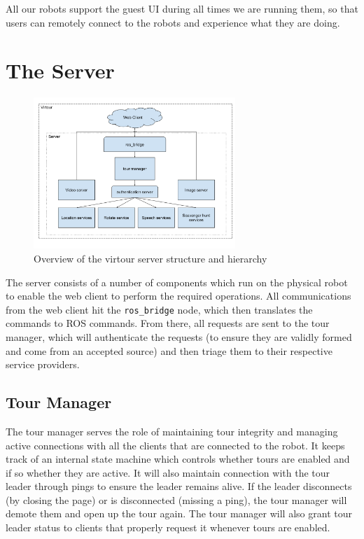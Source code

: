 \documentclass[
  oneside,
  11pt, a4paper,
  footinclude=true,
  headinclude=true,
  cleardoublepage=empty
]{article}
\begin{document}
All our robots support the guest UI during all times we are running them, so
that users can remotely connect to the robots and experience what they are
doing.

\section{The Server}

\begin{figure}
\centering
\includegraphics[width=3in]{virtour_server}
\caption{Overview of the virtour server structure and hierarchy}
\end{figure}

The server consists of a number of components which run on the physical robot
to enable the web client to perform the required operations. All communications
from the web client hit the \verb|ros_bridge| node, which then translates the
commands to ROS commands. From there, all requests are sent to the tour
manager, which will authenticate the requests (to ensure they are validly
formed and come from an accepted source) and then triage them to their
respective service providers.

\subsection{Tour Manager}

The tour manager serves the role of maintaining tour integrity and managing
active connections with all the clients that are connected to the robot. It
keeps track of an internal state machine which controls whether tours are
enabled and if so whether they are active. It will also maintain connection
with the tour leader through pings to ensure the leader remains alive. If the
leader disconnects (by closing the page) or is disconnected (missing a ping),
the tour manager will demote them and open up the tour again. The tour manager
will also grant tour leader status to clients that properly request it whenever
tours are enabled.
\end{document}
